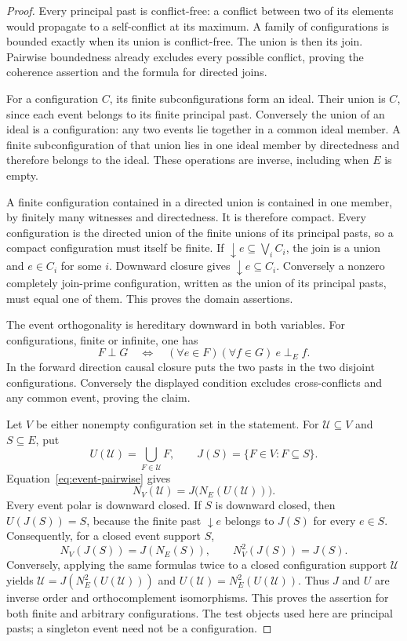 \begin{proof}
Every principal past is conflict-free: a conflict between two of
its elements would propagate to a self-conflict at its maximum.
A family of configurations is bounded exactly when its union is
conflict-free. The union is then its join. Pairwise boundedness
already excludes every possible conflict, proving the coherence
assertion and the formula for directed joins.

For a configuration $C$, its finite subconfigurations form an ideal.
Their union is $C$, since each event belongs to its finite principal
past. Conversely the union of an ideal is a configuration: any
two events lie together in a common ideal member. A finite
subconfiguration of that union lies in one ideal member by
directedness and therefore belongs to the ideal. These operations
are inverse, including when $E$ is empty.

A finite configuration contained in a directed union is contained
in one member, by finitely many witnesses and directedness. It is
therefore compact. Every configuration is the directed union of
the finite unions of its principal pasts, so a compact configuration
must itself be finite. If $\downarrow e\subseteq\bigvee_i C_i$,
the join is a union and $e\in C_i$ for some $i$. Downward closure
gives $\downarrow e\subseteq C_i$. Conversely a nonzero completely
join-prime configuration, written as the union of its principal
pasts, must equal one of them. This proves the domain assertions.

The event orthogonality is hereditary downward in both variables.
For configurations, finite or infinite, one has
\begin{equation}\label{eq:event-pairwise}
 F\perp G\quad\Longleftrightarrow\quad
 (\forall e\in F)(\forall f\in G)\ e\perp_E f.
\end{equation}
In the forward direction causal closure puts the two pasts in
the two disjoint configurations. Conversely the displayed condition
excludes cross-conflicts and any common event, proving the claim.

Let $V$ be either nonempty configuration set in the statement.
For $\mathcal U\subseteq V$ and $S\subseteq E$, put
\[
 U(\mathcal U)=\bigcup_{F\in\mathcal U}F,
 \qquad J(S)=\{F\in V:F\subseteq S\}.
\]
Equation~\eqref{eq:event-pairwise} gives
\[
 N_V(\mathcal U)=J\bigl(N_E(U(\mathcal U))\bigr).
\]
Every event polar is downward closed. If $S$ is downward closed,
then $U(J(S))=S$, because the finite past $\downarrow e$
belongs to $J(S)$ for every $e\in S$. Consequently, for a closed
event support $S$,
\[
 N_V(J(S))=J(N_E(S)),\qquad N_V^2(J(S))=J(S).
\]
Conversely, applying the same formulas twice to a closed
configuration support $\mathcal U$ yields
$\mathcal U=J(N_E^2(U(\mathcal U)))$ and
$U(\mathcal U)=N_E^2(U(\mathcal U))$.
Thus $J$ and $U$ are inverse order and orthocomplement isomorphisms.
This proves the assertion for both finite and arbitrary configurations.
The test objects used here are principal pasts; a singleton event
need not be a configuration.


\end{proof}
